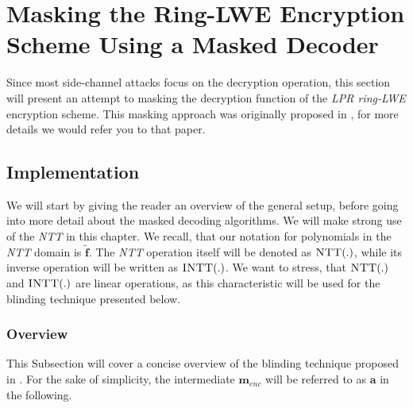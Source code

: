 \chapter{Masking the Ring-LWE Encryption Scheme Using a Masked Decoder}
Since most side-channel attacks focus on the decryption operation, this section will present an attempt to masking the decryption function of the \textit{\ac{LPR} \ac{ring-LWE}} encryption scheme. This masking approach was originally proposed in \cite{maskedRing}, for more details we would refer you to that paper.

\section{Implementation}
We will start by giving the reader an overview of the general setup, before going into more detail about the masked decoding algorithms. We will make strong use of the \textit{\ac{NTT}} in this chapter. We recall, that our notation for polynomials in the \textit{\ac{NTT}} domain is \(\tilde{\textbf{f}}\). The \textit{\ac{NTT}} operation itself will be denoted as \(\textsc{NTT}(.)\), while its inverse operation will be written as \(\textsc{INTT}(.)\). We want to stress, that \(\textsc{NTT}(.)\) and \(\textsc{INTT}(.)\) are linear operations, as this characteristic will be used for the blinding technique presented below.

\subsection{Overview}
This Subsection will cover a concise overview of the blinding technique proposed in \cite{maskedRing}. For the sake of simplicity, the intermediate \(\textbf{m}_{enc}\) will be referred to as \(\textbf{a}\) in the following.

